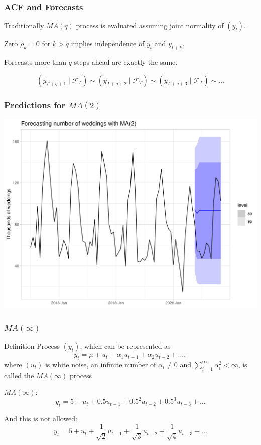 \begin{frame}
	\frametitle{ACF and Forecasts}
	
	Traditionally $MA(q)$ process is evaluated assuming joint normality of $(y_t)$.
	
	\pause
	Zero $\rho_k=0$ for $k>q$ implies independence of $y_t$ and $y_{t+k}$.
	
	\pause
	Forecasts more than $q$ steps ahead are exactly the same.
	
	\[
	(y_{T+q + 1} \mid \mathcal{F}_T) \sim (y_{T+q + 2} \mid \mathcal{F}_T) \sim (y_{T+q + 3} \mid \mathcal{F}_T) \sim \ldots
	\]
\end{frame}

\begin{frame}
	\frametitle{Predictions for $MA(2)$}
	
	\includegraphics[width=\textwidth]{pictures/om_ts_04-094.png}
	
	
\end{frame}




\begin{frame}
	\frametitle{$MA(\infty)$}
	
	\begin{block}{Definition}
		Process $(y_t)$, which \alert{can} be represented as
		\[
		y_t = \mu + u_t + \alpha_1 u_{t-1} + \alpha_2 u_{t-2} + \ldots,
		\]
		where $(u_t)$ is white noise, an infinite number of $\alpha_i \neq 0$ and
		$\sum_{i=1}^{\infty} \alpha_i^2 < \infty$,
		is called the $MA(\infty)$ process
	\end{block}
	
	\pause
	$MA(\infty)$:
	\[
	y_t = 5 + u_t + 0.5 u_{t-1} + 0.5^2 u_{t-2} + 0.5^3 u_{t-3} + \ldots
	\]
	
	\pause
	And \alert{this is not allowed}:
	\[
	y_t = 5 + u_t + \frac{1}{\sqrt{2}}u_{t-1} + \frac{1}{\sqrt{3}} u_{t-2} + \frac{1}{ \sqrt{4}} u_{t-3} + \ldots
	\]
	
\end{frame}

